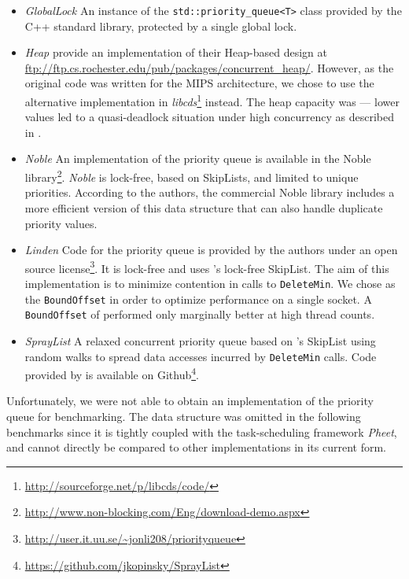\documentclass[a4paper,10pt]{article}
\begin{document}
\begin{itemize}
\item \textit{GlobalLock} An instance of the \lstinline|std::priority_queue<T>| class provided
      by the C++ standard library, protected by a single global lock.
\item \textit{Heap} \citeauthor{hunt1996efficient} provide an implementation
      of their Heap-based design \cite{hunt1996efficient} at \url{ftp://ftp.cs.rochester.edu/pub/packages/concurrent_heap/}.
      However, as the original code was written for the MIPS architecture, we chose to
      use the alternative implementation in \emph{libcds}\footnote{\url{http://sourceforge.net/p/libcds/code/}}
      instead. The heap capacity was  --- lower values led to a quasi-deadlock situation under high concurrency
      as described in \cite{dragicevic2008survey}.
\item \textit{Noble} An implementation of the \citeauthor{sundell2003fast} priority queue \cite{sundell2003fast}
      is available in the Noble library\footnote{\url{http://www.non-blocking.com/Eng/download-demo.aspx}}.
      \textit{Noble} is lock-free, based on SkipLists, and limited to unique priorities.
      According to the authors, the commercial Noble library includes a more efficient
      version of this data structure that can also handle duplicate priority values.
\item \textit{Linden} Code for the \citeauthor{linden2013skiplist} priority queue \cite{linden2013skiplist}
      is provided by the authors under an open source license\footnote{\url{http://user.it.uu.se/~jonli208/priorityqueue}}.
      It is lock-free and uses \citeauthor{fraser2004practical}'s lock-free
      SkipList. The aim of this implementation is to minimize contention in
      calls to \lstinline|DeleteMin|. We chose  as the \lstinline|BoundOffset| in order to optimize
      performance on a single socket. A \lstinline|BoundOffset| of  performed only marginally better
      at high thread counts.
\item \textit{SprayList} A relaxed concurrent priority queue based on \citeauthor{fraser2004practical}'s
      SkipList using random walks to spread data accesses
      incurred by \lstinline|DeleteMin| calls. Code provided by \citeauthor{alistarhspraylist} is
      available on Github\footnote{\url{https://github.com/jkopinsky/SprayList}}.
\end{itemize}

Unfortunately, we were not able to obtain an implementation of the \citeauthor{shavit2000skiplist}
priority queue for benchmarking. The \citeauthor{wimmer2013data} data structure was omitted in the
following benchmarks since it is tightly coupled with the task-scheduling framework \emph{Pheet},
and cannot directly be compared to other implementations in its current form.
\end{document}
